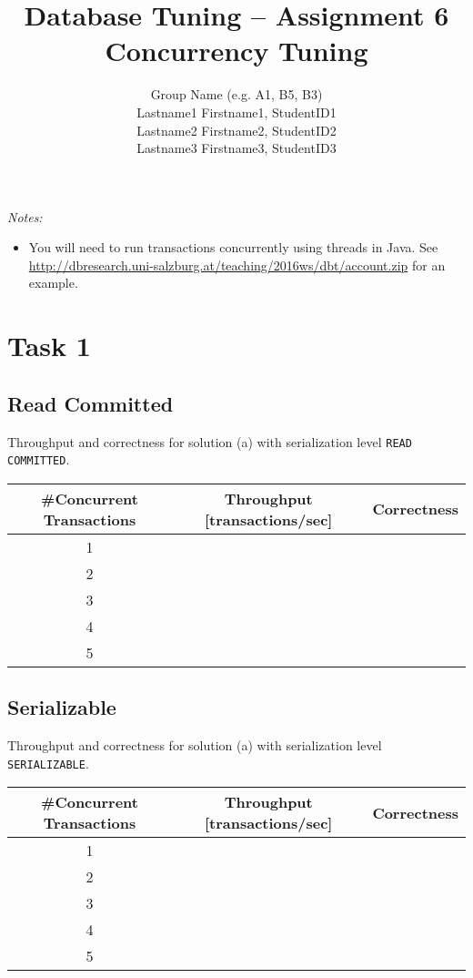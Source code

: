 \documentclass[11pt]{scrartcl}
\title{
  \textbf{\large Database Tuning -- Assignment 6}\\
  Concurrency Tuning
}
\author{
 Group Name (e.g. A1, B5, B3)\\
 \large Lastname1 Firstname1, StudentID1 \\
 \large Lastname2 Firstname2, StudentID2 \\
 \large Lastname3 Firstname3, StudentID3 
}
\begin{document}
\maketitle

\noindent
{\it Notes:}

\begin{itemize}
\item You will need to run transactions concurrently using threads in
  Java. See\\ \url{http://dbresearch.uni-salzburg.at/teaching/2016ws/dbt/account.zip}
  for an example.
\end{itemize}

\section*{Task 1}

\subsection*{Read Committed}

Throughput and correctness for solution (a) with serialization level
{\tt\small READ COMMITTED}.

\bigskip

\begin{tabular}{c|c|c}
  \#Concurrent Transactions & Throughput [transactions/sec] & Correctness
  \\\hline
  1 & & \\
  2 & & \\
  3 & & \\
  4 & & \\
  5 & & \\    
\end{tabular}

\medskip

\subsection*{Serializable}

Throughput and correctness for solution (a) with serialization level
{\tt\small SERIALIZABLE}.

\bigskip

\begin{tabular}{c|c|c}
  \#Concurrent Transactions & Throughput [transactions/sec] & Correctness
  \\\hline
  1 & & \\
  2 & & \\
  3 & & \\
  4 & & \\
  5 & & \\    
\end{tabular}
\end{document}
